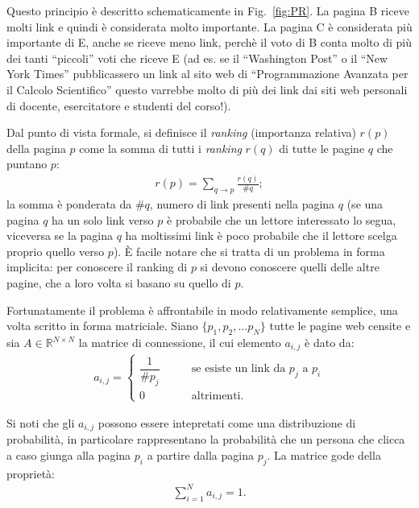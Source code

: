 Questo principio \`e descritto schematicamente in Fig.~\ref{fig:PR}.
La pagina B riceve molti link e quindi \`e considerata molto importante. La pagina
C \`e considerata pi\`u importante di E, anche se riceve meno link, perch\`e il voto di
B conta molto di pi\`u dei tanti ``piccoli'' voti che riceve E
(ad es. se il ``Washington Post'' o il ``New York Times'' pubblicassero un link al sito
web di ``Programmazione Avanzata per il Calcolo Scientifico'' questo varrebbe
molto di pi\`u dei link dai siti web personali di docente, esercitatore e studenti del corso!).

Dal punto di vista formale, si definisce il \emph{ranking} (importanza relativa) $r(p)$
della pagina $p$ come la somma di tutti i \emph{ranking} $r(q)$ di tutte le
pagine $q$ che puntano $p$:
\begin{align}
    \label{eq:rank}
    r(p)=\sum_{q \rightarrow p} \frac{r(q)}{\#q};
\end{align}
la somma \`e ponderata da $\#q$, numero di link presenti nella pagina $q$
(se una pagina $q$ ha un solo link verso $p$ \`e probabile che un lettore interessato lo segua,
viceversa se la pagina $q$ ha moltissimi link \`e poco probabile che il lettore scelga
proprio quello verso $p$).
\`E facile notare che si tratta di un problema in forma implicita: per conoscere il ranking di
$p$ si devono conoscere quelli delle altre pagine, che a loro volta si basano su quello di $p$.

Fortunatamente il problema \`e affrontabile in modo relativamente semplice, una volta scritto
in forma matriciale. Siano $\{p_1, p_2, \dots p_N\}$ tutte le pagine web censite e sia
$A \in \mathbb{R}^{N \times N}$ la matrice di connessione, il cui elemento $a_{i,j}$ \`e dato da:
\begin{align}
      \label{eq:harmonicp}
      a_{i,j}=
      \begin{cases}
        \dfrac{1}{\#p_j} &\qquad \mbox{se esiste un link da $p_j$ a $p_i$} \\[5mm]
        0 & \qquad \mbox{altrimenti.}
      \end{cases}
\end{align}

Si noti che gli $a_{i,j}$ possono essere intepretati come una distribuzione di probabilit\`a,
in particolare rappresentano la probabilit\`a che un persona che clicca a caso giunga alla
pagina $p_i$ a partire dalla pagina $p_j$. La matrice gode della propriet\`a:
\begin{align} \label{eq:sum1}
    \sum_{i=1}^{N} a_{i,j}=1.
\end{align}

